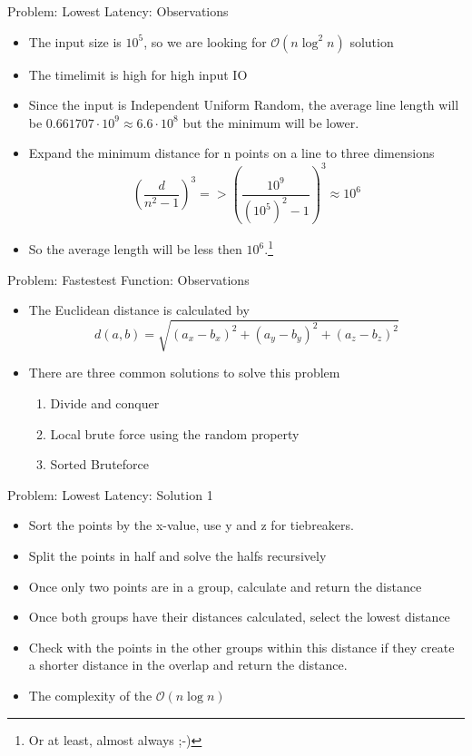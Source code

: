 \documentclass[11pt,pdf, aspectratio=169]{beamer}
\begin{document}
  \begin{frame}{Problem: Lowest Latency: Observations}
    \begin{itemize}
      \item<+-> The input size is $10^5$, so we are looking for $\mathcal{O}(n \log^2 n)$ solution
      \item<+-> The timelimit is high for high input IO
      \item<+-> Since the input is Independent Uniform Random, the average line length will be $0.661707\cdot 10^9 \approx 6.6\cdot 10^8 $ but the minimum will be lower.
      \item<+-> Expand the minimum distance for n points on a line to three dimensions \\
      \[
        \left( \frac{d}{n^2-1} \right)^3 => \left(\frac{10^9}{(10^5)^2-1}\right)^3 \approx 10^6
      \]
      \item<+-> So the average length will be less then $10^6$.\footnote{ Or at least, almost always ;-)}
    \end{itemize}
  \end{frame}
  \begin{frame}{Problem: Fastestest Function: Observations}
    \begin{itemize}
      \item<+-> The Euclidean distance is calculated by \\
      \[ d(a,b) = \sqrt {(a_x - b_x)^2 + (a_y - b_y)^2 + (a_z-b_z)^2}\]
      \item<+-> There are three common solutions to solve this problem
      \begin{enumerate}
        \item<+-> Divide and conquer
        \item<+-> Local brute force using the random property
        \item<+-> Sorted Bruteforce
      \end{enumerate}
    \end{itemize}
  \end{frame}
  \begin{frame}{Problem: Lowest Latency: Solution 1}
    \begin{itemize}
      \item Sort the points by the x-value, use y and z for tiebreakers.
      \item Split the points in half and solve the halfs recursively
      \item Once only two points are in a group, calculate and return the distance
      \item Once both groups have their distances calculated, select the lowest distance
      \item Check with the points in the other groups within this distance if they create a shorter distance in the overlap and return the distance.
      \item The complexity of the $\mathcal{O}(n \log n)$
    \end{itemize}
  \end{frame}
\end{document}
